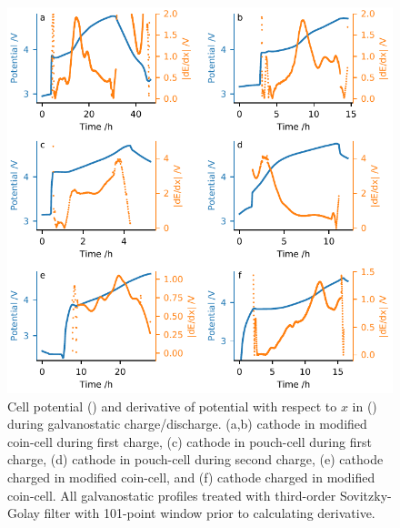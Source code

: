 \documentclass{article}
\begin{document}
\begin{figure}
  \begin{center}
    \includegraphics{figures/echem-derivatives.pdf}
  \end{center}
  \caption{Cell potential (\textcolor{C0}{\mplline{}}) and derivative
    of potential with respect to $x$ in 
    (\textcolor{C1}{\mpldots}) during galvanostatic
    charge/discharge. (a,b) \nmc[333]{} cathode in modified coin-cell
    during first charge, (c) \nca{} cathode in pouch-cell during first
    charge, (d) \nca{} cathode in pouch-cell during second charge, (e)
    \nca{} cathode charged in modified coin-cell, and (f) \nmc[532]{}
    cathode charged in modified coin-cell. All galvanostatic profiles
    treated with third-order Sovitzky-Golay filter with 101-point
    window prior to calculating derivative.}
  \label{fig:echem-derivatives}
\end{figure}
\end{document}
